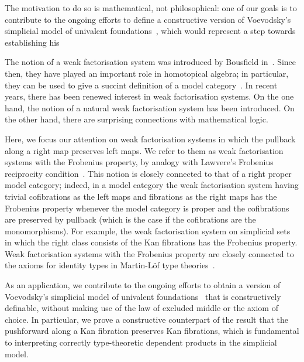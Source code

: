 \documentclass[reqno,10pt,a4paper,oneside]{amsart}
\begin{document}
The motivation to do so is mathematical, not philosophical: one of our goals is to contribute to the ongoing efforts
to define a constructive version of Voevodsky's simplicial model of univalent foundations~\cite{voevodsky-simplicial-model}, which would represent a step towards establishing his 

The notion of a weak factorisation system was introduced by Bousfield in~\cite{bousfield-wfs}. Since then, they have played an important role in homotopical
algebra; in particular, they can be used to give a succint definition of a model category~\cite{joyal-tierney-segal}.
In recent years, there has been renewed interest in weak factorisation systems. On
the one hand, the notion of a natural weak factorisation system has been introduced.
On the other hand, there are surprising connections with mathematical logic.

Here, we focus our attention on weak factorisation systems  in which the pullback along a right 
map preserves left maps. We refer to them as weak factorisation systems with the Frobenius property,
by analogy with Lawvere's Frobenius reciprocity condition~\cite{lawvere-1969}.
This notion is closely connected to that of a right proper model category; indeed,
in a model category 
the weak factorisation system having trivial cofibrations as the left maps
and fibrations as the right maps has the Frobenius property whenever the
model category is proper and the cofibrations are preserved by pullback (which is
the case if the cofibrations are the monomorphisms). 
For example, the weak factorisation system on simplicial sets in which
the right class consists of the Kan fibrations has the Frobenius property. Weak 
factorisation systems with the Frobenius property are closely connected to the axioms for
identity types in Martin-L\"of type theories~\cite[Section~4]{gambino-garner:idtypewfs}.

As an application, we contribute to the ongoing efforts to obtain a 
 version of Voevodsky's simplicial model of univalent foundations~\cite{voevodsky-simplicial-model}
that is constructively definable, \ie without making use of the law of excluded middle or the axiom of choice. In particular, we prove a constructive counterpart of the result that the pushforward along a Kan fibration preserves Kan fibrations, which is fundamental to interpreting correctly type-theoretic dependent products in the simplicial model.
\end{document}
